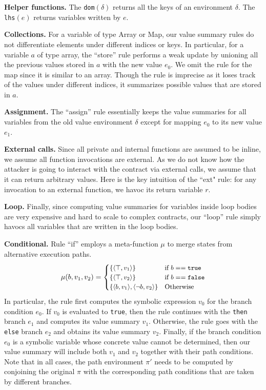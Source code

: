 \documentclass[conference, romanappendices]{tex/IEEEtran}
\theoremstyle{bfnote}
\newcommand{\valEnv}{\delta}
\newcommand{\pathEnv}{\pi}
\newcommand{\union}{\mu}
\begin{document}
\noindent
\textbf{Helper functions.}
The \texttt{dom}$(\valEnv)$ returns all the keys of an environment $\valEnv$. The \texttt{lhs}$(e)$ returns variables written by $e$. 

\noindent
\textbf{Collections.}
For a variable of type Array or Map, our value summary rules do not differentiate elements under different indices or keys. In particular, for a variable $a$ of type array, the ``store'' rule performs a weak update by unioning all the previous values stored in $a$ with the new value $e_0$. We omit the rule for the map since it is similar to an array. Though the rule is imprecise as it loses track of the values under different indices, it summarizes possible values that are stored in $a$.

\noindent
\textbf{Assignment.}
The ``assign'' rule essentially keeps the value summaries for all variables from the old value environment $\valEnv$ except for mapping $e_0$ to its new value $e_1$. 


\noindent
\textbf{External calls.} 
Since all private and internal functions are assumed to be inline, we assume all function invocations are external. 
As we do not know how the attacker is going to interact with the contract via external calls, we assume that it can return arbitrary values. Here is the key intuition of the ``ext" rule: for any invocation to an external function, 
we havoc its return variable $r$.

\noindent
\textbf{Loop.}
Finally, since computing value summaries for variables inside loop bodies are very expensive and hard to scale to complex contracts, our ``loop'' rule simply havocs all variables that are written in the loop bodies.

\noindent
\textbf{Conditional.}
Rule ``if'' employs a meta-function $\union$ to merge states from alternative execution paths.
\vspace{-1.5mm}
\[
\small
\union(b, v_1, v_2) = 
\begin{cases}
  \{ \langle \top, v_1 \rangle \} & \text{if } b== \mathtt{true}\\    
  \{ \langle \top, v_2 \rangle \} & \text{if } b== \mathtt{false}\\    
  \{ \langle b, v_1 \rangle, \langle \neg b, v_2 \rangle \} & \text{Otherwise }\\     
\end{cases}
\]
In particular, the rule first computes the symbolic expression $v_0$ for the branch condition $e_0$. If $v_0$ is evaluated to \texttt{true}, then the rule continues with the \texttt{then} branch $e_1$ and computes its value summary $v_1$.
Otherwise, the rule goes with the \texttt{else} branch $e_2$ and obtains its value summary $v_2$. Finally, if the branch condition $e_0$ is a symbolic variable whose concrete value cannot be determined, then our value summary will include both $v_1$ and $v_2$ together with their path conditions.
Note that in all cases, the path environment $\pathEnv'$ needs to be computed by conjoining the original $\pathEnv$ with the corresponding path conditions that are taken by different branches.
\end{document}
